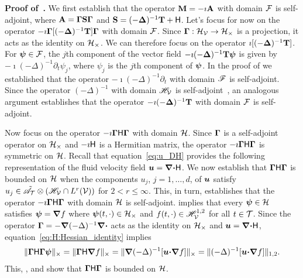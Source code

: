 \documentclass[amsa]{ipart}
\begin{document}
\textbf{Proof of~.}\hspace{1ex}
%
We first establish that the operator $\mathbf{M}=-\imath \mathbf{A}$ with domain
$\mathcal{F}$ is self-adjoint, where
$\mathbf{A}=\mbox{\boldmath${\Gamma}$}\mathbf{S}\mbox{\boldmath${\Gamma}$}$ and $\mathbf{S}=(-\mbox{\boldmath${\Delta}$})^{-1}\mathbf{T}+\mathsf{H}$. Let's focus
for now on the operator $-\imath\mbox{\boldmath${\Gamma}$}[(-\mbox{\boldmath${\Delta}$})^{-1}\mathbf{T}]\mbox{\boldmath${\Gamma}$}$
with domain $\mathcal{F}$. Since $\mbox{\boldmath${\Gamma}$}:\mathcal{H}_{\mathcal{V}}\to\mathcal{H}_\times$ is
a projection, it acts as the identity on $\mathcal{H}_\times$. We can therefore
focus on the operator $\imath[(-\mbox{\boldmath${\Delta}$})^{-1}\mathbf{T}]$. For $\mbox{\boldmath${\psi}$}\in\mathcal{F}$, the
$j$th component of the vector field $-\imath(-\mbox{\boldmath${\Delta}$})^{-1}\mathbf{T}\mbox{\boldmath${\psi}$}$ is
given by $-\imath(-\Delta)^{-1}\partial_t\psi_j$, where $\psi_j$ is the $j$th component of
$\mbox{\boldmath${\psi}$}$. In the proof of  we established
that the operator $-\imath(-\Delta)^{-1}\partial_t$ with domain $\mathscr{F}$ is
self-adjoint. Since the operator $(-\Delta)^{-1}$ with domain $\mathscr{H}_{\mathcal{V}}$ is
self-adjoint~\cite{Stakgold:BVP:2000}, an analogous argument
establishes that the operator $-\imath(-\mbox{\boldmath${\Delta}$})^{-1}\mathbf{T}$ with domain $\mathcal{F}$
is self-adjoint.   



Now focus on the operator $-\imath\mbox{\boldmath${\Gamma}$}\mathsf{H}\mbox{\boldmath${\Gamma}$}$ with domain
$\mathcal{H}$. Since $\mbox{\boldmath${\Gamma}$}$ is a self-adjoint operator on $\mathcal{H}_\times$ and
$-\imath\mathsf{H}$ is a Hermitian matrix, the operator $-\imath\mbox{\boldmath${\Gamma}$}\mathsf{H}\mbox{\boldmath${\Gamma}$}$ is
symmetric on $\mathcal{H}$. Recall that equation~\eqref{eq:u_DH} provides the
following representation of the fluid velocity field
$\boldsymbol{u}=\mbox{\boldmath${\nabla}$}\mbox{\boldmath${\cdot}$}\mathsf{H}$. We now establish that $\mbox{\boldmath${\Gamma}$}\mathsf{H}\mbox{\boldmath${\Gamma}$}$ is 
bounded on $\mathcal{H}$ when the components $u_j$, $j=1,\ldots,d$, of $\boldsymbol{u}$
satisfy $u_j\in\tilde{\mathscr{A}}_{\mathcal{T}}\otimes(\mathscr{H}_{\mathcal{V}}\cap L^r(\mathcal{V}))$ for 
$2<r\leq\infty$. This, in turn, establishes that the operator
$-\imath\mbox{\boldmath${\Gamma}$}\mathsf{H}\mbox{\boldmath${\Gamma}$}$ with domain $\mathcal{H}$ is
self-adjoint.  implies that every $\mbox{\boldmath${\psi}$}\in\mathcal{H}$
satisfies $\boldsymbol{\psi}=\mbox{\boldmath${\nabla}$} f$ where $\mbox{\boldmath${\psi}$}(t,\cdot)\in\mathcal{H}_\times$ and
$f(t,\cdot)\in\mathscr{H}^{1,2}_{\mathcal{V}}$ for all $t\in\mathcal{T}$. Since the operator
$\mbox{\boldmath${\Gamma}$}=-\mbox{\boldmath${\nabla}$}(-\Delta)^{-1}\mbox{\boldmath${\nabla}$}\mbox{\boldmath${\cdot}$}$ acts as the identity on
$\mathcal{H}_\times$ and $\boldsymbol{u}=\mbox{\boldmath${\nabla}$}\mbox{\boldmath${\cdot}$}\mathsf{H}$,
equation~\eqref{eq:H:Hessian_identity} implies 
%
\begin{align}
  \|\bGamma\Hm\bGamma\bpsi\|_\times
  =\|\bGamma\Hm\bnabla f\|_\times
  =\|\bnabla(-\Delta)^{-1}[\vecu\bcdot\bnabla f]\|_\times
  =\|(-\Delta)^{-1}[\vecu\bcdot\bnabla f]\|_{1,2}.
\end{align}
%
This, , and  show
that $\mbox{\boldmath${\Gamma}$}\mathsf{H}\mbox{\boldmath${\Gamma}$}$ is bounded on $\mathcal{H}$.
\end{document}
